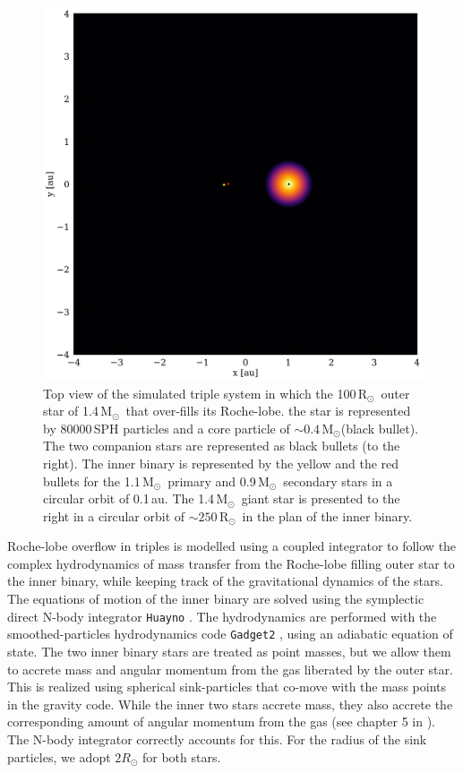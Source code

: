 \documentclass{aastex62}
\newcommand{\MSun}{\mbox{M$_\odot$}}
\newcommand{\RSun}{\mbox{R$_\odot$}}
\begin{document}
\begin{figure}[ht!]
  \includegraphics[width=\columnwidth]{fig_BBSS_gas_M14Msun_A010au_t0002.pdf}
\caption{Top view of the simulated triple system in which the
  100\,\RSun\, outer star of 1.4\,\MSun\, that over-fills its
  Roche-lobe.  the star is represented by 80000\,SPH particles and a
  core particle of $\sim 0.4$\,\MSun (black bullet). The two companion
  stars are represented as black bullets (to the right).  The inner
  binary is represented by the yellow and the red bullets for the
  1.1\,\MSun\, primary and 0.9\,\MSun\, secondary stars in a circular
  orbit of 0.1\,au. The 1.4\,\MSun\, giant star is presented to the
  right in a circular orbit of $\sim 250$\,\RSun\, in the plan of the
  inner binary.
\label{fig:topview_at_t0}}
\end{figure}

Roche-lobe overflow in triples is modelled using a coupled integrator
to follow the complex hydrodynamics of mass transfer from the
Roche-lobe filling outer star to the inner binary, while keeping track
of the gravitational dynamics of the stars.  The equations of motion
of the inner binary are solved using the symplectic direct N-body
integrator \texttt{Huayno} \citep{2012NewA...17..711P}. The
hydrodynamics are performed with the smoothed-particles hydrodynamics
code \texttt{Gadget2} \citep{2000ascl.soft03001S}, using an adiabatic
equation of state.  The two inner binary stars are treated as point
masses, but we allow them to accrete mass and angular momentum from
the gas liberated by the outer star.  This is realized using spherical
sink-particles that co-move with the mass points in the gravity
code. While the inner two stars accrete mass, they also accrete the
corresponding amount of angular momentum from the gas (see chapter 5
in \cite{AMUSE}).  The N-body integrator correctly accounts for this.
For the radius of the sink particles, we adopt $2 R_\odot$ for both
stars.
\end{document}
